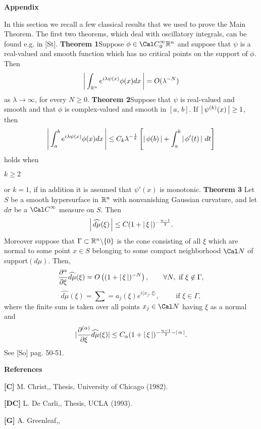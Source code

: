 \centerline{\bf Appendix}
\bigskip
In this section we recall a few classical results that we used to prove the Main 
Theorem.
The first two theorems, which deal with  oscillatory integrals,  can be found e.g. 
in [St].
\proclaim
{\bf Theorem 1}\quad Suppose  $\phi \in {\Cal C}^{\infty}_0{\R^n}$ and suppose that
$\psi$ is a real-valued and smooth function which has no critical points on the 
support of $\phi$. Then 
$$
\left\vert\,{\int_{{\Bbb R}^n} e^{i\lambda\psi(x)}\phi(x)dx}\,\right\vert = O(\lambda^{-N}) 
$$
as $\lambda\to \infty$, for every $N \ge 0$.
\endproclaim
\medskip
\proclaim
{\bf Theorem 2}\quad Suppose that $\psi$ is  real-valued and smooth 
and that $\phi$ is complex-valued and smooth in $[a,\,b]$. If
$\left\vert\,{\psi^{(k)}(x)}\,\right\vert\ge 1$, then
$$
\left\vert\,{\int^b_a e^{i\lambda\psi(x)}\phi(x)dx}\,\right\vert\leq C_k\lambda^{-\frac{1}{k}}
\left[\left\vert\,{\phi(b)}\,\right\vert+\int^b_a\left\vert\,{\phi'(t)}\,\right\vert\,dt\right]
$$
holds when
\roster
\item $ k\ge 2$
\item or $k=1$, if in addition it is assumed that $\psi'(x)$ is monotonic.
\endroster
\endproclaim
\medskip
\proclaim
{\bf Theorem 3}\quad 
 Let $S$ be a smooth hypersurface in ${\Bbb R}^{n}$ 
with nonvanishing Gaussian curvature, and let 
$d\sigma $
be a ${\Cal C}^\infty$ measure  on $S$.
Then
$$
\left\vert\,{\widehat{ d\mu}(\xi)}\,\right\vert \leq C(1+\left\vert\,{\xi}\,\right\vert)^{-\frac {n-1}{2}} .
$$
Moreover suppose that $\Gamma\subset {\Bbb R}^n\backslash\{0\} $ is the cone consisting
of all $\xi$ which are normal to some point $x\in S$ belonging to
some compact neighborhood ${\Cal N}$ of support$(d\mu)$. Then,
$$
\frac{\partial^{\alpha}}{\partial{\xi}}\widehat{ d\mu}(\xi) = O\left((1+\left\vert\,{\xi}\,\right\vert)^{-N}\right), 
\qquad \forall N, \text{ if }
\xi\not\in\Gamma,
$$
$$
\widehat{ d\mu}(\xi) =\sum
= a_j(\xi)e^{i\langle x_j,\,\xi\rangle},\qquad \text{ if }\xi\in\Gamma,
$$
where the finite sum is taken over all points $x_j\in {\Cal N}$ having
$\xi$ as a normal and 
$$
\vert
\frac{\partial^{(\alpha)}}{\partial\xi}\widehat {d\mu}(\xi)\vert \leq C_\alpha(1+\left\vert\,{\xi}\,\right\vert)^
{-\frac {n-1}{2}-\left\vert\,{\alpha}\,\right\vert}.
$$
\endproclaim
{} See [So] pag. 50-51.
\enddemo
\bigskip
\centerline{\bf References}
\bigskip
\item{{\bf [C]}} M.  Christ,, Thesis, University of Chicago (1982). 
\par
\item{{\bf [DC]}} L. De Carli,, Thesis, UCLA (1993). 
\par
\item{{\bf [G]}} A. Greenleaf,,
